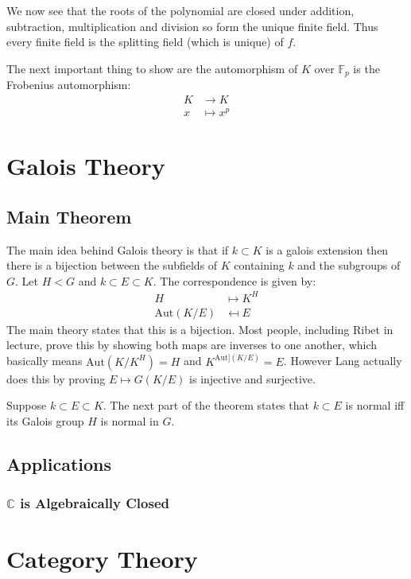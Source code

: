 \documentclass[12pt]{book}
\begin{document}
We now see that the roots of the polynomial are closed under addition, subtraction, multiplication and division so form the unique finite field. Thus every finite field is the splitting field (which is unique) of $f$. 

The next important thing to show are the automorphism of $K$ over $\mathbb{F}_p$ is the Frobenius automorphism:
\begin{align*}
K &\rightarrow K \\
x &\mapsto x^p
\end{align*} 

\chapter{Galois Theory}

\section{Main Theorem}

The main idea behind Galois theory is that if $k \subset K$ is a galois extension then there is a bijection between the subfields of $K$ containing $k$ and the subgroups of $G$.  Let $H < G$ and $k \subset E \subset K$. The correspondence is given by:
\begin{align*}
 H &\mapsto K^H \\
 \text{Aut}(K/E) &\mapsfrom E
\end{align*}
The main theory states that this is a bijection. Most people, including Ribet in lecture, prove this by showing both maps are inverses to one another, which basically means $\text{Aut}(K/K^H)=H$ and $K^{\text{Aut}](K/E)}=E$. However Lang actually does this by proving $E \mapsto G(K/E)$ is injective and surjective. 

Suppose $k \subset E \subset K$. The next part of the theorem states that $k \subset E$ is normal iff its Galois group $H$ is normal in $G$. 
\section{Applications}
\subsection{$\mathbb{C}$ is Algebraically Closed}

 \chapter{Category Theory}
 
\end{document}
